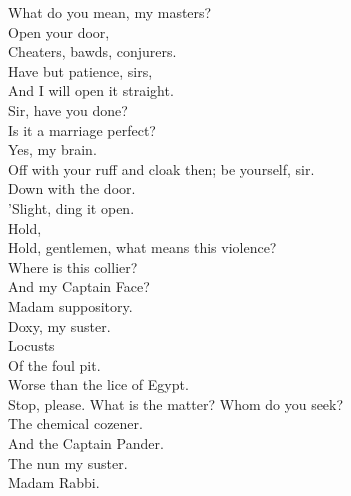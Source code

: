 \documentclass[a4paper,oneside,12pt]{memoir}
\begin{document}
\begin{drama*}
\lovewitspeaks What do you mean, my masters?\\
\mammonspeaks {} Open your door,\\
Cheaters, bawds, conjurers.\\
\lovewitspeaks {} Have but patience, sirs,\\
And I will open it straight.\\
\facespeaks {} Sir, have you done?\\
Is it a marriage perfect?\\
\lovewitspeaks {} Yes, my brain.\\
\facespeaks Off with your ruff and cloak then; be yourself, sir.\\
\surlyspeaks Down with the door.\\
\kastrilspeaks {} 'Slight, ding it open.\\
\lovewitspeaks {} Hold,\\
Hold, gentlemen, what means this violence?\\
\mammonspeaks Where is this collier?\\
\surlyspeaks {} And my Captain Face?\\
\mammonspeaks Madam suppository.\\
\kastrilspeaks {} Doxy, my suster.\\
\persecutionspeaks {} Locusts\\
Of the foul pit.\\
\tribulationspeaks {} Worse than the lice of Egypt.\\
\lovewitspeaks Stop, please. What is the matter? Whom do you seek?\\
\mammonspeaks The chemical cozener.\\
\surlyspeaks {} And the Captain Pander.\\
\kastrilspeaks The nun my suster.\\
\mammonspeaks {} Madam Rabbi.\\

\end{drama*}
\end{document}
